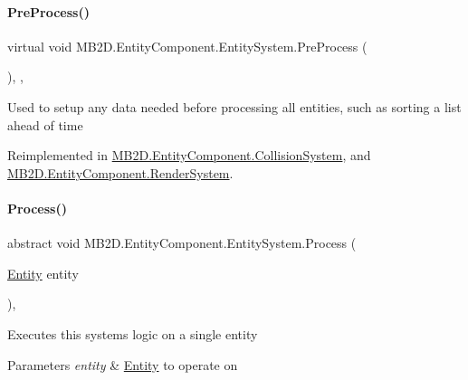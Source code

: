 \paragraph{\texorpdfstring{Pre\+Process()}{PreProcess()}}
{\footnotesize\ttfamily virtual void M\+B2\+D.\+Entity\+Component.\+Entity\+System.\+Pre\+Process (\begin{DoxyParamCaption}{ }\end{DoxyParamCaption})\hspace{0.3cm}{\ttfamily [inline]}, {\ttfamily [protected]}, {\ttfamily [virtual]}}



Used to setup any data needed before processing all entities, such as sorting a list ahead of time 



Reimplemented in \hyperlink{class_m_b2_d_1_1_entity_component_1_1_collision_system_ad591227767c8b6c66ca3891de04e9050}{M\+B2\+D.\+Entity\+Component.\+Collision\+System}, and \hyperlink{class_m_b2_d_1_1_entity_component_1_1_render_system_aadd36efe73a5f8cc489894232a5fc201}{M\+B2\+D.\+Entity\+Component.\+Render\+System}.

\hypertarget{class_m_b2_d_1_1_entity_component_1_1_entity_system_abbf83b87cb5d12754fb058cef50451fa}{}\label{class_m_b2_d_1_1_entity_component_1_1_entity_system_abbf83b87cb5d12754fb058cef50451fa} 
\paragraph{\texorpdfstring{Process()}{Process()}}
{\footnotesize\ttfamily abstract void M\+B2\+D.\+Entity\+Component.\+Entity\+System.\+Process (\begin{DoxyParamCaption}\item[{\hyperlink{class_m_b2_d_1_1_entity_component_1_1_entity}{Entity}}]{entity }\end{DoxyParamCaption})\hspace{0.3cm}{\ttfamily [protected]}, {}}



Executes this systems logic on a single entity 


\begin{DoxyParams}{Parameters}
{\em entity} & \hyperlink{class_m_b2_d_1_1_entity_component_1_1_entity}{Entity} to operate on\\
\hline
\end{DoxyParams}


